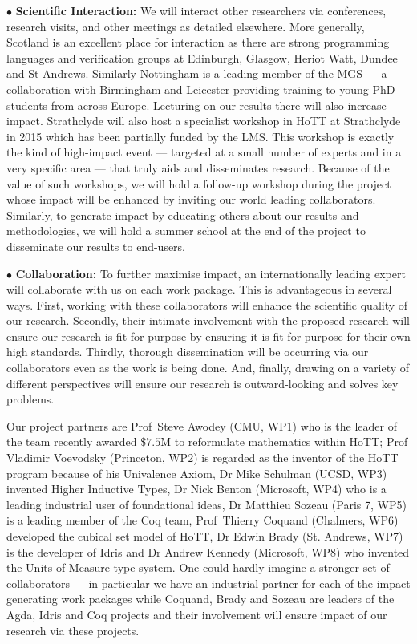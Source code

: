 \documentclass[a4paper,11pt]{article}
\begin{document}
\vspace*{0.02in} $\bullet$ {\bf Scientific Interaction:} We will
interact other researchers via conferences,
research visits, and other meetings as detailed elsewhere. More
generally, Scotland is an excellent place for interaction as there are
strong programming languages and verification groups at Edinburgh,
Glasgow, Heriot Watt, Dundee and St Andrews. Similarly Nottingham is a
leading member of the MGS --- a collaboration with Birmingham and
Leicester providing training to young PhD students
from across Europe. Lecturing on our results there will also increase
impact. Strathclyde will also host a specialist
workshop in HoTT at Strathclyde in 2015 which has been partially
funded by the LMS. This workshop is exactly the kind of high-impact
event --- targeted at a small number of experts and in a very specific
area --- that truly aids and disseminates research. Because of the
value of such workshops, we will hold a follow-up workshop during
the project whose impact will be enhanced by inviting our
world leading collaborators. Similarly, to generate impact by
educating others about our results and methodologies, we will hold a
summer school at the end of the project to disseminate our results to
end-users.

\vspace*{0.02in}

$\bullet$ {\bf Collaboration:} To further maximise impact, an
internationally leading expert will collaborate with us on each work
package.  This is advantageous in several ways. First, working with
these collaborators will enhance the scientific quality of our
research. Secondly, their intimate involvement with the proposed
research will ensure our research is fit-for-purpose by ensuring it is
fit-for-purpose for their own high standards. Thirdly, thorough
dissemination will be occurring via our collaborators even as the work
is being done. And, finally, drawing on a variety of different
perspectives will ensure our research is outward-looking and solves
key problems.

Our project partners are Prof~Steve Awodey (CMU, WP1) who is the
leader of the team recently awarded $\$7.5$M to reformulate
mathematics within HoTT; Prof Vladimir Voevodsky (Princeton, WP2) is
regarded as the inventor of the HoTT program because of his Univalence
Axiom, Dr Mike Schulman (UCSD, WP3) invented Higher Inductive
Types, Dr Nick Benton (Microsoft, WP4) who is a leading industrial
user of foundational ideas, Dr Matthieu Sozeau (Paris 7, WP5) is a
leading member of the Coq team, Prof~Thierry Coquand (Chalmers, WP6)
developed the cubical set model of HoTT, Dr Edwin Brady
(St. Andrews, WP7) is the developer of Idris and Dr Andrew Kennedy
(Microsoft, WP8) who invented the Units of Measure type system. One
could hardly imagine a stronger set of collaborators --- in particular
we have an industrial partner for each of the impact generating work
packages while Coquand, Brady and Sozeau are leaders of the Agda,
Idris and Coq projects and their involvement will ensure impact of our
research via these projects.
\end{document}
